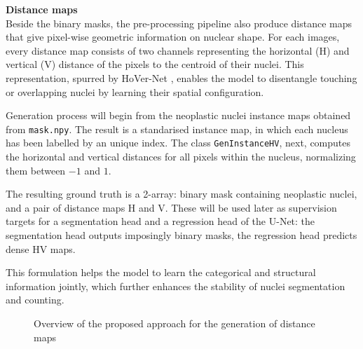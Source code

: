 \documentclass[target=bach,aauheader=,style=]{thud}
\begin{document}
\noindent\textbf{Distance maps}\\
Beside the binary masks, the pre-processing pipeline also produce distance maps that give pixel-wise geometric information on nuclear shape. For each images, every distance map consists of two channels representing the horizontal (H) and vertical (V) distance of the pixels to the centroid of their nuclei. This representation, spurred by HoVer-Net \cite{graham2019hovernet}, enables the model to disentangle touching or overlapping nuclei by learning their spatial configuration.

Generation process will begin from the neoplastic nuclei instance maps obtained from \texttt{mask.npy}. The result is a standarised instance map, in which each nucleus has been labelled by an unique index. The class \texttt{GenInstanceHV}, next, computes the horizontal and vertical distances for all pixels within the nucleus, normalizing them between $-1$ and $1$.

The resulting ground truth is a 2-array: binary mask containing neoplastic nuclei, and a pair of distance maps H and V. These will be used later as supervision targets for a segmentation head and a regression head of the U-Net: the segmentation head outputs imposingly binary masks, the regression head predicts dense HV maps.

This formulation helps the model to learn the categorical and structural information jointly, which further enhances the stability of nuclei segmentation and counting.
\begin{figure}[htbp] %
\centering
{}
\caption{Overview of the proposed approach for the generation of distance maps}
\label{fig:esempio}
\end{figure}
\end{document}
